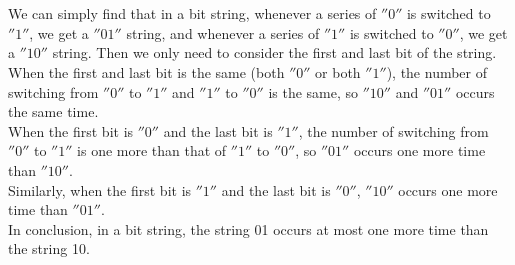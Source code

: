 \documentclass{article}
\begin{document}
\section{}

We can simply find that in a bit string, whenever a series of $''0''$ is switched to $''1''$, we get a $''01''$ string, and whenever a series of $''1''$ is switched to $''0''$, we get a $''10''$ string. Then we only need to consider the first and last bit of the string.\\

When the first and last bit is the same (both $''0''$ or both $''1''$), the number of switching from $''0''$ to $''1''$ and $''1''$ to $''0''$ is the same, so $''10''$ and $''01''$ occurs the same time.\\

When the first bit is $''0''$ and the last bit is $''1''$, 
the number of switching from $''0''$ to $''1''$ is one more than that of $''1''$ to $''0''$, so $''01''$ occurs one more time than $''10''$.\\

Similarly, when the first bit is $''1''$ and the last bit is $''0''$, $''10''$ occurs one more time than $''01''$.\\

In conclusion, in a bit string, the string 01 occurs at most one more time than the string 10.
\end{document}
